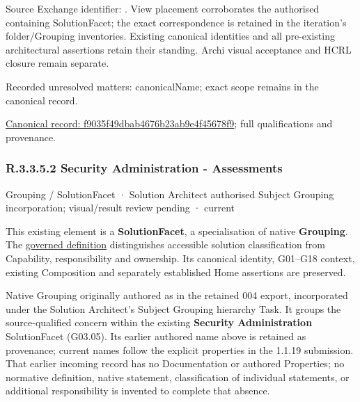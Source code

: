 Source Exchange identifier: \texttt{}. View placement corroborates
the authorised containing SolutionFacet; the exact correspondence is retained in the
iteration's folder/Grouping inventories. Existing canonical identities and all
pre-existing architectural assertions retain their standing. Archi visual
acceptance and HCRL closure remain separate.


{\small Recorded unresolved matters: canonicalName; exact scope remains in the canonical record.}\par
{\footnotesize \href{../../../../../../../continuum/grouping/f9035f49dbab4676b23ab9e4f45678f9.md}{Canonical record: f9035f49dbab4676b23ab9e4f45678f9}; full qualifications and provenance.}\par
\subsubsection*{R.3.3.5.2 Security Administration - Assessments}
\label{navigation:R.3.3.5.2}

\label{element:b1997b3f14724bb983c06963fa7b4ea6}
{\small Grouping / SolutionFacet · Solution Architect authorised Subject Grouping incorporation; visual/result review pending · current}\par

This existing element is a \textbf{SolutionFacet}, a specialisation of native
\textbf{Grouping}. The \href{\detokenize{../../../../../../../governance/continuum-representation.md#solutionfacet-classification--1119-candidate}}{governed definition}
distinguishes accessible solution classification from Capability, responsibility
and ownership. Its canonical identity, G01–G18 context, existing Composition
and separately established Home assertions are preserved.



Native Grouping originally authored as \texttt{} in the retained 004 export,
incorporated under the Solution Architect's Subject Grouping hierarchy Task.
It groups the source-qualified \texttt{} concern within
the existing \textbf{Security Administration} SolutionFacet (G03.05). Its earlier authored name above is retained as provenance; current names
follow the explicit properties in the 1.1.19 submission.
That earlier incoming record has no Documentation or authored Properties; no normative
definition, native statement, classification of individual statements, or
additional responsibility is invented to complete that absence.



